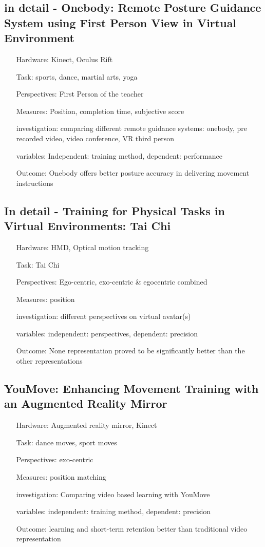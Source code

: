 \subsection{in detail - Onebody: Remote Posture Guidance System using First Person View in Virtual Environment}
\begin{itemize}
	\item[Hardware:] Kinect, Oculus Rift
	\item[Task:] sports, dance, martial arts, yoga
	\item[Perspectives:] First Person of the teacher
	\item[Measures:] Position, completion time, subjective score
	\item[investigation:] comparing different remote guidance systems: onebody, pre recorded video, video conference, VR third person
	\item[variables:] Independent: training method, dependent: performance
	\item[Outcome:] Onebody offers better posture accuracy in delivering movement instructions
\end{itemize}

\subsection{In detail - Training for Physical Tasks in Virtual Environments: Tai Chi}
\begin{itemize}
	\item[Hardware:] HMD, Optical motion tracking
	\item[Task:] Tai Chi
	\item[Perspectives:] Ego-centric, exo-centric \& egocentric combined
	\item[Measures:] position
	\item[investigation:] different perspectives on virtual avatar(s)
	\item[variables:] independent: perspectives, dependent: precision
	\item[Outcome:] None representation proved to be significantly better than the other representations
\end{itemize}

\subsection{YouMove: Enhancing Movement Training with an Augmented Reality Mirror}
\begin{itemize}
	\item[Hardware:] Augmented reality mirror, Kinect
	\item[Task:] dance moves, sport moves
	\item[Perspectives:] exo-centric
	\item[Measures:] position matching
	\item[investigation:] Comparing video based learning with YouMove
	\item[variables:] independent: training method, dependent: precision
	\item[Outcome:] learning and short-term retention better than traditional video representation
\end{itemize}

